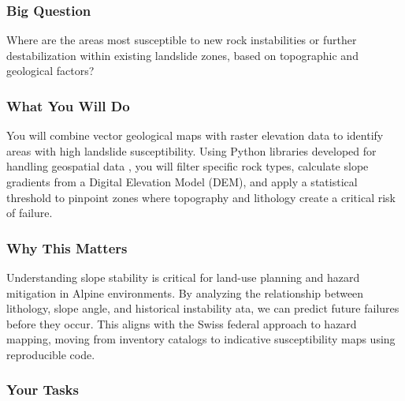\documentclass[
  letterpaper,
  DIV=11,
  numbers=noendperiod]{scrartcl}
\begin{document}
\begin{tcolorbox}[enhanced jigsaw, arc=.35mm, left=2mm, toprule=.15mm, colbacktitle=quarto-callout-note-color!10!white, toptitle=1mm, breakable, opacityback=0, rightrule=.15mm, title=\textcolor{quarto-callout-note-color}{\faInfo}\hspace{0.5em}{This exercise in brief}, colframe=quarto-callout-note-color-frame, bottomrule=.15mm, colback=white, opacitybacktitle=0.6, bottomtitle=1mm, titlerule=0mm, coltitle=black, leftrule=.75mm]

\subsubsection{Big Question}\label{big-question}

Where are the areas most susceptible to new rock instabilities or
further destabilization within existing landslide zones, based on
topographic and geological factors?

\subsubsection{What You Will Do}\label{what-you-will-do}

You will combine vector geological maps with raster elevation data to
identify areas with high landslide susceptibility. Using Python
libraries developed for handling geospatial data , you will filter
specific rock types, calculate slope gradients from a Digital Elevation
Model (DEM), and apply a statistical threshold to pinpoint zones where
topography and lithology create a critical risk of failure.

\subsubsection{Why This Matters}\label{why-this-matters}

Understanding slope stability is critical for land-use planning and
hazard mitigation in Alpine environments. By analyzing the relationship
between lithology, slope angle, and historical instability ata, we can
predict future failures before they occur. This aligns with the Swiss
federal approach to hazard mapping, moving from inventory catalogs to
indicative susceptibility maps using reproducible code.

\subsubsection{Your Tasks}\label{your-tasks}


\end{tcolorbox}
\end{document}
